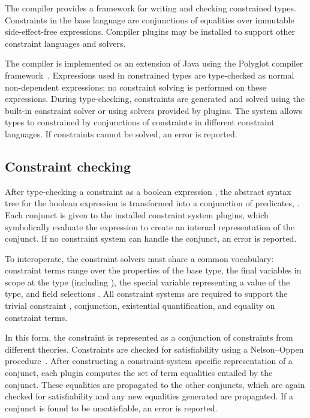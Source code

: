 %

The \Xten{} compiler provides a framework for writing and
checking constrained types.  
Constraints in the base \Xten{} language are conjunctions
of equalities over immutable side-effect-free expressions.
Compiler plugins may be installed
to support other constraint languages and solvers.

The \Xten{} compiler is implemented as an extension of
Java using the Polyglot compiler framework~\cite{ncm03}.
Expressions used in constrained
types are type-checked as normal non-dependent \Xten{} expressions;
no constraint solving is performed on these expressions.
During type-checking, constraints are generated and solved using
the built-in constraint solver or using solvers provided by
plugins.  The system allows types to constrained by conjunctions
of constraints in different constraint languages.
If constraints cannot be solved, an error is reported.

\subsection{Constraint checking}

After type-checking a constraint as a boolean expression ,
the abstract syntax tree for
the boolean expression is transformed into a conjunction of
predicates, .
Each conjunct  is given to 
the installed constraint system plugins, which symbolically
evaluate the expression to create an internal representation of
the conjunct.  If no
constraint system can handle the conjunct, an error is reported.

To interoperate, the constraint solvers must share a common
vocabulary: constraint terms  range over the properties of the
base type, the final variables in scope at the type (including
), the special variable  representing
a value of the type, and field selections .
All
constraint systems are required to support the trivial
constraint
, conjunction, existential quantification, and equality on
constraint terms.


In this form, the constraint is represented as a 
conjunction of constraints from different theories.  Constraints
are checked for satisfiability using a Nelson--Oppen
procedure~\cite{nelson-oppen}.
After constructing a constraint-system specific 
representation of a conjunct, each plugin computes the set of
term equalities entailed by the conjunct.  These equalities are
propagated to the other conjuncts, which are again checked for
satisfiability and any new equalities generated are propagated.
If a conjunct is found to be unsatisfiable, an error is
reported. 

